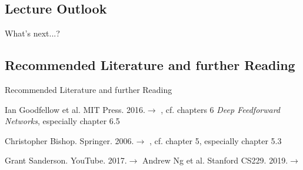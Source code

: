 \subsection{Lecture Outlook}

\begin{frame}{What's next...?}{}
\end{frame}


\subsection{Recommended Literature and further Reading}

\begin{frame}[allowframebreaks]{Recommended Literature and further Reading}{}
	\footnotesize
	\begin{thebibliography}{2}
			{Ian Goodfellow et al. MIT Press. 2016.}{$\rightarrow$ \href{
				http://www.deeplearningbook.org/
			}{}, cf. chapters 6 \textit{Deep Feedforward Networks}, especially chapter 6.5}
	
			{Christopher Bishop. Springer. 2006.}{$\rightarrow$ \href{
				http://users.isr.ist.utl.pt/~wurmd/Livros/school/Bishop\%20-\%20Pattern\%20Recognition\%20And\%20Machine\%20Learning\%20-\%20Springer\%20\%202006.pdf
			}{}, cf. chapter 5, especially chapter 5.3}

			{Grant Sanderson. YouTube. 2017.}{$\rightarrow$ \href{
				https://www.youtube.com/watch?v=tIeHLnjs5U8
			}{}}
			{Andrew Ng et al. Stanford CS229. 2019.}{$\rightarrow$ \href{
				http://cs229.stanford.edu/notes/backprop.py
			}{}}
	\end{thebibliography}
\end{frame}


